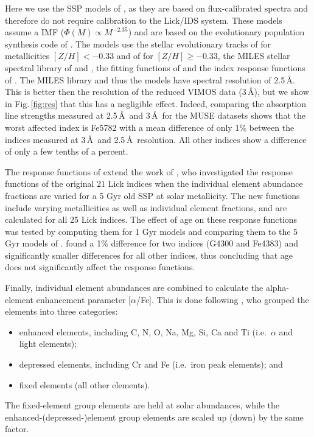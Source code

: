 			Here we use the SSP models of \citet[; hereafter TMJ]{Thomas2010}, as they are based on flux-calibrated spectra and therefore do not require calibration to the Lick/IDS system. These models assume a \citet{Salpeter1955} IMF ($\Phi(M) \propto M^{-2.35}$) and are based on the evolutionary population synthesis code of \citet{Maraston1998}. The models use the stellar evolutionary tracks of \citet{Cassisi1997} for metallicities $[Z/H] < -0.33$ and of \citet{Girardi2000} for $[Z/H] \ge -0.33$, the MILES stellar spectral library of \citet{Sanchez-Blazquez2006a} and \citet{Falcon-Barroso2011a}, the fitting functions of \citet{Johansson2010} and the index response functions of \citet{Korn2005}. The MILES library and thus the models have spectral resolution of 2.5\,\AA. This is better then the resolution of the reduced VIMOS data (3\,\AA), but we show in Fig.\,\ref{fig:res} that this has a negligible effect. Indeed, comparing the absorption line strengths measured at 2.5\,\AA\ and 3\,\AA\ for the MUSE datasets shows that the worst affected index is Fe5782 with a mean difference of only 1\% between the indices measured at 3\,\AA\ and 2.5\,\AA\ resolution. All other indices show a difference of only a few tenths of a percent. 

			The response functions of \citet{Korn2005} extend the work of \citet{Tripicco1995}, who investigated the response functions of the original 21 Lick indices when the individual element abundance fractions are varied for a 5 Gyr old SSP at solar metallicity. The new functions include varying metallicities as well as individual element fractions, and are calculated for all 25 Lick indices. The effect of age on these response functions was tested by computing them for 1 Gyr models and comparing them to the 5 Gyr models of \citet{Tripicco1995}. \citet{Korn2005} found a 1\% difference for two indices (G4300 and Fe4383) and significantly smaller differences for all other indices, thus concluding that age does not significantly affect the response functions.

			Finally, individual element abundances are combined to calculate the alpha-element enhancement parameter [$\alpha$/Fe]. This is done following \citet{Trager2000}, who grouped the elements into three categories: 
			\begin{itemize}
				\item enhanced elements, including C, N, O, Na, Mg, Si, Ca and Ti (i.e.\ $\alpha$ and light elements); 
				\item depressed elements, including Cr and Fe (i.e.\ iron peak elements); and
				\item fixed elements (all other elements). 
			\end{itemize}
			The fixed-element group elements are held at solar abundances, while the enhanced-(depressed-)element group elements are scaled up (down) by the same factor. 

